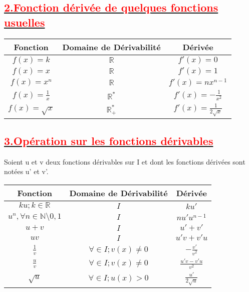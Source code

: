 \documentclass[12pt]{article}
\begin{document}
\subsection*{\underline{\textbf{\textcolor{red}{2.Fonction dérivée de quelques fonctions usuelles}}}}
\begin{center}
    \begin{tabular}{|c|c|c|}
        \hline
        Fonction             & Domaine de Dérivabilité & Dérivée                       \\
        \hline
        $f(x) = k$           & $\mathbb{R}$            & $f'(x)=0$                     \\
        \hline
        $f(x) = x$           & $\mathbb{R}$            & $f'(x) = 1$                   \\
        \hline
        $f(x) = x^{n}$       & $\mathbb{R}$            & $f'(x) = nx^{n-1}$            \\
        \hline
        $f(x) = \frac{1}{x}$ & $\mathbb{R}^{*}$        & $f'(x) = -\frac{1}{x^{2}}$    \\
        \hline
        $f(x) = \sqrt{x}$    & $\mathbb{R}^{*}_{+}$    & $f'(x) = \frac{1}{2\sqrt{x}}$ \\
        \hline
    \end{tabular}
\end{center}
\subsection*{\underline{\textbf{\textcolor{red}{3.Opération sur les fonctions dérivables}}}}
Soient u et v deux fonctions dérivables sur I et dont les fonctions dérivées sont notées u' et v'.
\begin{center}
    \begin{tabular}{|c|c|c|}
        \hline
        Fonction                                        & Domaine de Dérivabilité      & Dérivée                 \\
        \hline
        $ku;k\in \mathbb{R}$                            & $I$                          & $ku'$                   \\
        \hline
        $u^{n}, \forall n \in \mathbb{N}\setminus{0,1}$ & $I$                          & $nu'u^{n-1}$            \\
        \hline
        $u+v$                                           & $I$                          & $u'+v'$                 \\
        \hline
        $uv$                                            & $I$                          & $u'v+v'u$               \\
        \hline
        $\frac{1}{v}$                                   & $\forall \in I; v(x) \neq 0$ & $-\frac{v'}{v^{2}}$     \\
        \hline
        $\frac{u}{v}$                                   & $\forall \in I; v(x) \neq 0$ & $\frac{u'v-v'u}{v^{2}}$ \\
        \hline
        $\sqrt{u}$                                      & $\forall \in I; u(x) > 0$    & $\frac{u'}{2\sqrt{u}}$  \\
        \hline
    \end{tabular}
\end{center}
\end{document}

